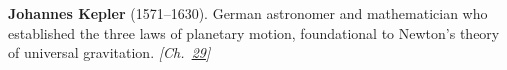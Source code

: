 \textbf{Johannes Kepler} (1571–1630). German astronomer and mathematician who established the three laws of planetary motion, foundational to Newton's theory of universal gravitation. \emph{[Ch.~\hyperref[ch:hatmonotile]{29}]}

